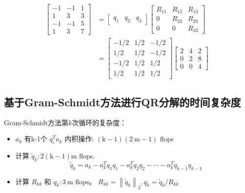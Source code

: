 \begin{example}
$$
\begin{aligned}
\left[\begin{array}{rrr}
-1 & -1 & 1 \\
1 & 3 & 3 \\
-1 & -1 & 5 \\
1 & 3 & 7
\end{array}\right] &=\left[\begin{array}{lll}
q_{1} & q_{2} & q_{3}
\end{array}\right]\left[\begin{array}{ccc}
R_{11} & R_{12} & R_{13} \\
0 & R_{22} & R_{23} \\
0 & 0 & R_{33}
\end{array}\right] \\
&=\left[\begin{array}{rrr}
-1 / 2 & 1 / 2 & -1 / 2 \\
1 / 2 & 1 / 2 & -1 / 2 \\
-1 / 2 & 1 / 2 & 1 / 2 \\
1 / 2 & 1 / 2 & 1 / 2
\end{array}\right]\left[\begin{array}{rrr}
2 & 4 & 2 \\
0 & 2 & 8 \\
0 & 0 & 4
\end{array}\right]
\end{aligned}
$$
\end{example}



\subsection{基于Gram-Schmidt方法进行QR分解的时间复杂度}

Gram-Schmidt方法第$k$次循环的复杂度：

\begin{itemize}
    \item $ a_{k} $ 有k-1个 $ q_{i}^{T} a_{k} $ 内积操作: $ (\mathrm{k}-1)(2 \mathrm{~m}-1) $ flops
    \item 计算 $ \tilde{q}_{k}: 2(\mathrm{k}-1) \mathrm{m} $ flops. $$ \quad \tilde{q}_{k}=a_{k}-a_{k}^{T} q_{1} q_{1}-a_{k}^{T} q_{2} q_{2}-\cdots-a_{k}^{T} q_{k-1} q_{k-1} $$
    \item 计算 $ R_{k k} $ 和 $ q_{k}: 3 \mathrm{~m} $ flops。 $  R_{k k}=\left\|\tilde{q}_{k}\right\|_{2}, q_{k}=\tilde{q}_{k} / R_{k k} $
\end{itemize}

